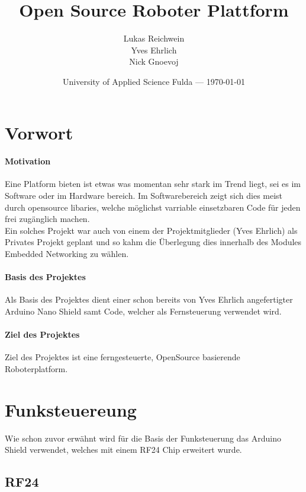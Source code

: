 \documentclass{article}
\title{Open Source Roboter Plattform} %
\author{Lukas Reichwein\\ Yves Ehrlich\\ Nick Gnoevoj}
\date{University of Applied Science Fulda --- \today} %
\begin{document}
\maketitle %
\tableofcontents %
\newpage


\section{Vorwort} %
    \paragraph{Motivation}
    Eine Platform bieten ist etwas was momentan sehr stark im Trend liegt, sei es im Software oder im Hardware bereich. Im Softwarebereich zeigt sich dies meist durch opensource libaries, welche möglichst varriable einsetzbaren Code für jeden frei zugänglich machen. \\    
    Ein solches Projekt war auch von einem der Projektmitglieder (Yves Ehrlich) als Privates Projekt geplant und so kahm die Überlegung dies innerhalb des Modules Embedded Networking zu wählen.\linebreak
    \paragraph{Basis des Projektes}
    Als Basis des Projektes dient einer schon bereits von Yves Ehrlich angefertigter Arduino Nano Shield samt Code,
    \cite{nanoGame} welcher als Fernsteuerung verwendet wird. 
    \paragraph{Ziel des Projektes}	
	Ziel des Projektes ist eine ferngesteuerte, OpenSource basierende Roboterplatform.
\newpage
\section{Funksteuereung} %
    Wie schon zuvor erwähnt wird für die Basis der Funksteuerung das Arduino Shield verwendet, welches mit einem RF24 Chip erweitert wurde.
    \subsection{RF24} %
\end{document}
